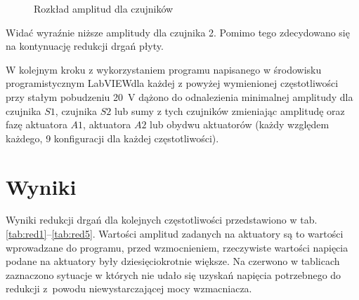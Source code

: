 \documentclass[polish,a4paper,11pt]{mwart}
\let\Oldsection\section
\renewcommand{\section}{\FloatBarrier\Oldsection}
\begin{document}
\begin{figure}[!tbh]
  
  \caption{Rozkład amplitud dla czujników}
  \label{fig:mody}
\end{figure}

Widać wyraźnie niższe amplitudy dla czujnika 2. Pomimo tego zdecydowano się na
kontynuację redukcji drgań płyty.

W kolejnym kroku z wykorzystaniem programu napisanego w środowisku
programistycznym LabVIEW\texttrademark dla każdej z powyżej wymienionej częstotliwości przy
stałym pobudzeniu \SI{20}{\volt} dążono do odnalezienia minimalnej amplitudy dla
czujnika $S1$, czujnika $S2$ lub sumy z tych czujników zmieniając amplitudę oraz fazę
aktuatora $A1$, aktuatora $A2$ lub obydwu aktuatorów (każdy względem każdego, 9
konfiguracji dla każdej częstotliwości).

\section{Wyniki}

Wyniki redukcji drgań dla kolejnych częstotliwości przedstawiono w tab.
\ref{tab:red1}--\ref{tab:red5}. Wartości amplitud zadanych na aktuatory są to
wartości wprowadzane do programu, przed wzmocnieniem, rzeczywiste wartości
napięcia podane na aktuatory były dziesięciokrotnie większe. Na czerwono w
tablicach zaznaczono sytuacje w których nie udało się uzyskań napięcia
potrzebnego do redukcji z~powodu niewystarczającej mocy wzmacniacza.
\end{document}
